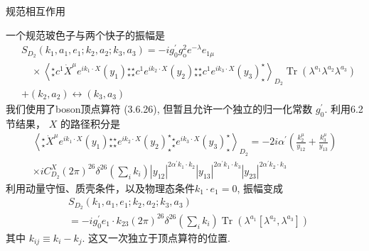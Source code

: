 \centerline{\Large 规范相互作用}
一个规范玻色子与两个快子的振幅是
\begin{equation}
	\begin{aligned}
		&S_{D_{2}}\left(k_{1}, a_{1}, e_{1} ; k_{2}, a_{2} ; k_{3}, a_{3}\right)=-i g_{0}^{\prime} g_{\mathrm{o}}^{2} e^{-\lambda} e_{1 \mu} \\
		&\quad \times\left\langle {}_{\star}^{\star} c^{1} \dot{X}^{\mu} e^{i k_{1} \cdot X}\left(y_{1}\right) {}_{\star}^{\star} {}_{\star}^{\star}  c^{1} e^{i k_{2} \cdot X}\left(y_{2}\right) {}_{\star}^{\star} {}_{\star}^{\star}  c^{1} e^{i k_{3} \cdot X}\left(y_{3}\right)_{\star}^{\star}\right\rangle_{D_{2}} \operatorname{Tr}\left(\lambda^{a_{1}} \lambda^{a_{2}} \lambda^{a_{3}}\right) \\
		&+\left(k_{2}, a_{2}\right) \leftrightarrow\left(k_{3}, a_{3}\right)
	\end{aligned}
\end{equation}
我们使用了boson顶点算符 (3.6.26), 但暂且允许一个独立的归一化常数 $g_{0}^{\prime}$. 利用6.2节结果， $X$ 的路径积分是
\begin{equation}
	\begin{aligned}
		\left\langle {}_{\star}^{\star} \dot{X}^{\mu} e^{i k_{1} \cdot X}\left(y_{1}\right) {}_{\star}^{\star} {}_{\star}^{\star}  e^{i k_{2} \cdot X}\left(y_{2}\right)_{\star}^{\star } {}_{\star}^{\star} e^{i k_{3} \cdot X}\left(y_{3}\right)_{\star}^{\star} \right\rangle_{D_{2}}=-2 i \alpha^{\prime}\left(\frac{k_{2}^{\mu}}{y_{12}}+\frac{k_{3}^{\mu}}{y_{13}}\right) \\
		\times i C_{D_{2}}^{X}(2 \pi)^{26} \delta^{26}\left(\sum_{i} k_{i}\right)\left|y_{12}\right|^{2 \alpha^{\prime} k_{1} \cdot k_{2}}\left|y_{13}\right|^{2 \alpha^{\prime} k_{1} \cdot k_{3}}\left|y_{23}\right|^{2 \alpha^{\prime} k_{2} \cdot k_{3}}
	\end{aligned}
\end{equation}
利用动量守恒、质壳条件，以及物理态条件$k_{1} \cdot e_{1}=0$, 振幅变成
\begin{equation}
	\begin{aligned}
		&S_{D_{2}}\left(k_{1}, a_{1}, e_{1} ; k_{2}, a_{2} ; k_{3}, a_{3}\right) \\
		&=-i g_{0}^{\prime} e_{1} \cdot k_{23}(2 \pi)^{26} \delta^{26}\left(\sum_{i} k_{i}\right) \operatorname{Tr}\left(\lambda^{a_{1}}\left[\lambda^{a_{2}}, \lambda^{a_{3}}\right]\right)
	\end{aligned}
\end{equation}
其中 $k_{i j} \equiv k_{i}-k_{j} $.  这又一次独立于顶点算符的位置.\\
